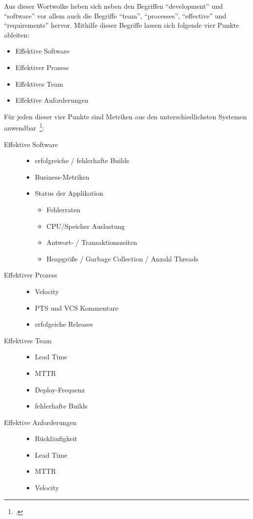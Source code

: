 Aus dieser Wortwolke heben sich neben den Begriffen ``development'' und ``software'' vor allem auch die Begriffe ``team'', ``processes'', ``effective'' und ``requirements'' hervor.
Mithilfe dieser Begriffe lassen sich folgende vier Punkte ableiten:

\begin{itemize}[noitemsep]
  \item Effektive Software
  \item Effektiver Prozess
  \item Effektives Team 
  \item Effektive Anforderungen 
\end{itemize}

Für jeden dieser vier Punkte sind Metriken aus den unterschiedlichsten Systemen anwendbar~\footcite[vgl.][S.219ff]{davis_agile_2015}:

\begin{description}
  \item[Effektive Software] \hfill
  \begin{itemize}[noitemsep]
    \item erfolgreiche / fehlerhafte Builds
    \item Business-Metriken
    \item Status der Applikation
    \begin{itemize}[noitemsep]
      \item Fehlerraten
      \item CPU/Speicher Auslastung
      \item Antwort- / Transaktionszeiten
      \item Heapgröße / Garbage Collection / Anzahl Threads
    \end{itemize}
  \end{itemize}
  \item[Effektiver Prozess] \hfill
  \begin{itemize}[noitemsep]
    \item Velocity
    \item \ac{PTS} und \ac{VCS} Kommentare
    \item erfolgeiche Releases
  \end{itemize}
  \item[Effektives Team] \hfill
  \begin{itemize}[noitemsep]
    \item Lead Time
    \item \ac{MTTR}
    \item Deploy-Frequenz
    \item fehlerhafte Builds
  \end{itemize}
  \item[Effektive Anforderungen] \hfill
  \begin{itemize}[noitemsep]
    \item Rückläufigkeit
    \item Lead Time
    \item \ac{MTTR}
    \item Velocity
  \end{itemize}
\end{description}

